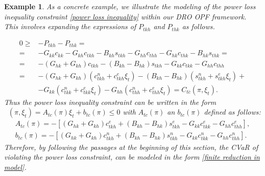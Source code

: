 \documentclass[11pt,a4paper,oneside,openany]{book}
\DeclareMathOperator{\C}{C_{tc}}
\newtheorem{example}{Example}
\numberwithin{definition}{section}
\numberwithin{theorem}{section}
\numberwithin{problem}{section}
\begin{document}
\begin{example}
As a concrete example, we illustrate the modeling of the power loss inequality constraint \eqref{power loss inequality} within our DRO OPF framework. This involves expanding the expressions of \(P_{tkh}\) and \(P_{thk}\) as follows.

\begin{align*}
    0 \geq & -P_{tkh}-P_{thk} = \\ =& -G_{kk}c_{kk}-G_{kh}c_{tkh}-B_{kh}s_{tkh} -G_{hh}c_{thh}-G_{hk}c_{thk}-B_{hk}s_{thk} = \\ = &
    -(G_{hk}+G_{kh})c_{tkh}-(B_{kh}-B_{hk})s_{tkh}-G_{kk}c_{tkk}-G_{hh}c_{thh} \\
    = & -(G_{hk}+G_{kh})(c_{tkh}^n+c_{tkh}^e\xi_t)-(B_{kh}-B_{hk})(s_{tkh}^n+s_{tkh}^e\xi_t) + \\ &-G_{kk}(c_{tkk}^n+c_{tkk}^e\xi_t)-G_{hh}(c_{thh}^n+c_{thh}^e\xi_t) = C_{t\bar c}(\pi, \xi_t).
\end{align*} 
Thus the power loss inequality constraint can be written in the form $\C(\pi,\xi_t) = A_{tc}(\pi)\xi_t + b_{tc}(\pi) \leq 0$ with \(A_{tc}(\pi)\) an \(b_{tc}(\pi)\) defined as follows:
\begin{align*}
    A_{tc}(\pi) = -\left[(G_{hk} + G_{kh})c^e_{tkh} + (B_{kh}-B_{hk})s^e_{tkh}-G_{kk}c^e_{tkk}-G_{hh}c^e_{thh} \right], \\
    b_{tc}(\pi) =  -\left[(G_{hk} + G_{kh})c^n_{tkh} + (B_{kh}-B_{hk})s^n_{tkh}-G_{kk}c^n_{tkk}-G_{hh}c^n_{thh} \right] .
\end{align*}
Therefore, by following the passages at the beginning of this section, the CVaR of violating the power loss constraint, can be modeled in the form \eqref{finite reduction in model}.




\end{example}
\end{document}
